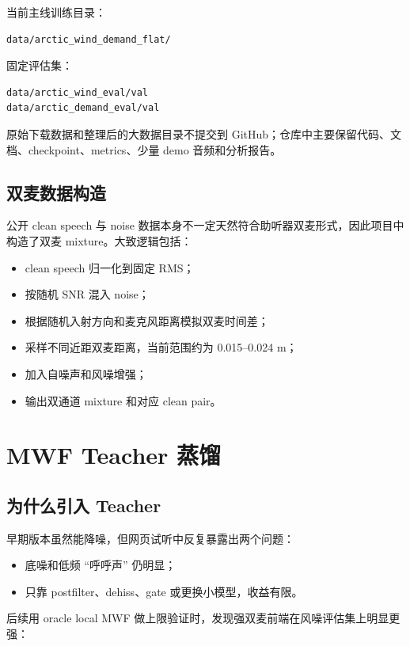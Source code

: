 \documentclass[UTF8,12pt,a4paper]{ctexart}
\begin{document}
当前主线训练目录：

\begin{lstlisting}
data/arctic_wind_demand_flat/
\end{lstlisting}

固定评估集：

\begin{lstlisting}
data/arctic_wind_eval/val
data/arctic_demand_eval/val
\end{lstlisting}

原始下载数据和整理后的大数据目录不提交到 GitHub；仓库中主要保留代码、文档、checkpoint、metrics、少量 demo 音频和分析报告。

\subsection{双麦数据构造}

公开 clean speech 与 noise 数据本身不一定天然符合助听器双麦形式，因此项目中构造了双麦 mixture。大致逻辑包括：

\begin{itemize}
  \item clean speech 归一化到固定 RMS；
  \item 按随机 SNR 混入 noise；
  \item 根据随机入射方向和麦克风距离模拟双麦时间差；
  \item 采样不同近距双麦距离，当前范围约为 0.015--0.024 m；
  \item 加入自噪声和风噪增强；
  \item 输出双通道 mixture 和对应 clean pair。
\end{itemize}

\section{MWF Teacher 蒸馏}

\subsection{为什么引入 Teacher}

早期版本虽然能降噪，但网页试听中反复暴露出两个问题：

\begin{itemize}
  \item 底噪和低频 ``呼呼声'' 仍明显；
  \item 只靠 postfilter、dehiss、gate 或更换小模型，收益有限。
\end{itemize}

后续用 oracle local MWF 做上限验证时，发现强双麦前端在风噪评估集上明显更强：
\end{document}
